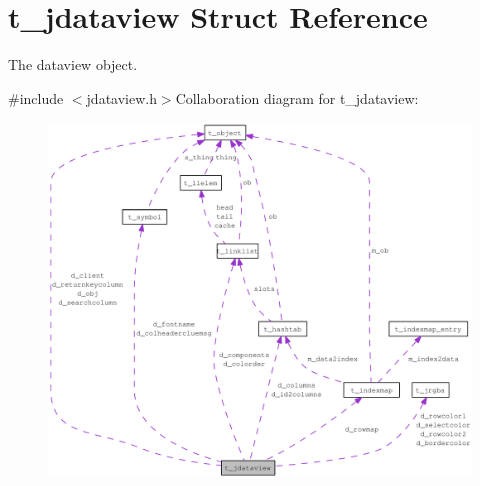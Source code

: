\hypertarget{structt__jdataview}{
\section{t\_\-jdataview Struct Reference}
\label{structt__jdataview}
}


The dataview object.  


{\ttfamily \#include $<$jdataview.h$>$}Collaboration diagram for t\_\-jdataview:\nopagebreak
\begin{figure}[H]
\begin{center}
\leavevmode
\includegraphics[width=400pt]{structt__jdataview__coll__graph}
\end{center}
\end{figure}
